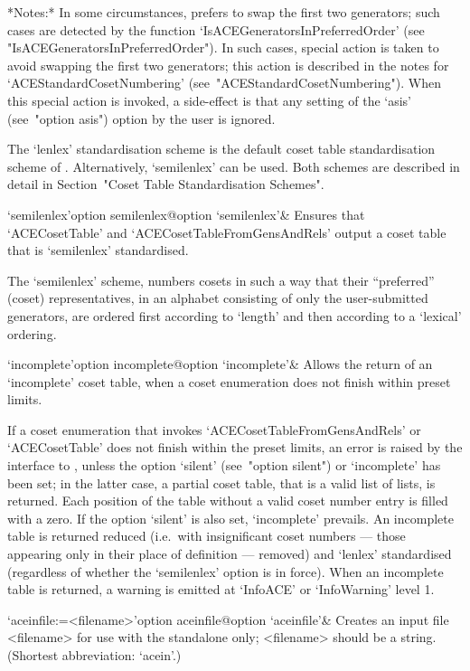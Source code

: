 *Notes:*
In  some  circumstances,  {\ACE}  prefers  to  swap  the   first   two
generators;   such   cases    are    detected    by    the    function
`IsACEGeneratorsInPreferredOrder'                                 (see
"IsACEGeneratorsInPreferredOrder"). In such cases, special  action  is
taken to avoid {\ACE} swapping the first two generators;  this  action
is   described   in   the   notes   for    `ACEStandardCosetNumbering'
(see~"ACEStandardCosetNumbering").  When  this   special   action   is
invoked, a side-effect is that any setting of the `asis'  (see~"option
asis") option by the user is ignored.

The  `lenlex'  standardisation  scheme  is  the  default  coset  table
standardisation  scheme  of  {\GAP}. Alternatively, `semilenlex' can
be used. Both schemes are described in detail in  Section~"Coset
Table Standardisation Schemes".

\>`semilenlex'{option semilenlex}@{option `semilenlex'}& 
Ensures that `ACECosetTable' and `ACECosetTableFromGensAndRels' output
a coset table that is `semilenlex' standardised.

The `semilenlex' scheme, numbers cosets  in  such  a  way  that  their
``preferred'' (coset) representatives, in an  alphabet  consisting  of
only the user-submitted generators, are  ordered  first  according  to
`length' and then according to a `lexical' ordering.

\>`incomplete'{option incomplete}@{option `incomplete'}& 
Allows the return  of  an  `incomplete'  coset  table,  when  a  coset
enumeration does not finish within preset limits.

If a coset enumeration that invokes `ACECosetTableFromGensAndRels'  or
`ACECosetTable' does not finish within the preset limits, an error  is
raised  by  the  interface  to  {\GAP},  unless  the  option  `silent'
(see~"option silent") or `incomplete' has  been  set;  in  the  latter
case, a partial coset table, that is a valid {\GAP} list of lists,  is
returned. Each position of the table  without  a  valid  coset  number
entry is filled with a zero. If  the  option  `silent'  is  also  set,
`incomplete'  prevails.  An  incomplete  table  is
returned reduced (i.e.~with  insignificant  coset  numbers  ---  those
appearing only in their place of definition --- removed) and  `lenlex'
standardised (regardless of whether  the  `semilenlex'  option  is  in
force). When an incomplete table is  returned,  a
warning is emitted at `InfoACE' or `InfoWarning' level 1.

\>`aceinfile:=<filename>'{option aceinfile}@{option `aceinfile'}&
Creates an {\ACE} input file <filename> for use  with  the  standalone
only; <filename> should be a string. (Shortest abbreviation: `acein'.)

